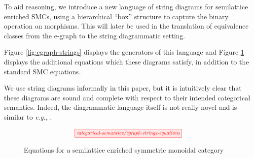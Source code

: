 To aid reasoning, we introduce a new language of string diagrams for semilattice enriched SMCs, using a hierarchical ``box'' structure to capture the binary operation on morphisms.  This will later be used in the translation of equivalence classes from the e-graph to the string diagrammatic setting. 

Figure \ref{fig:egraph-strings} displays the generators of this language and Figure \ref{fig:string-equations} displays the additional equations which these diagrams satisfy, in addition to the standard SMC equations. 

We use string diagrams informally in this paper, but it is intuitively clear that these diagrams are sound and complete with respect to their intended categorical semantics. Indeed, the diagrammatic language itself is not really novel and is similar to \textit{e.g.}, \cite{duncan_generalised_2009}. 

\begin{figure}
\[  
    \scalebox{0.75}{
	\tikzfig{categorical-semantics/egraph-strings-equations}
    }
\]
\caption{Equations for a  semilattice enriched symmetric monoidal category}
\label{fig:string-equations}
\end{figure}
